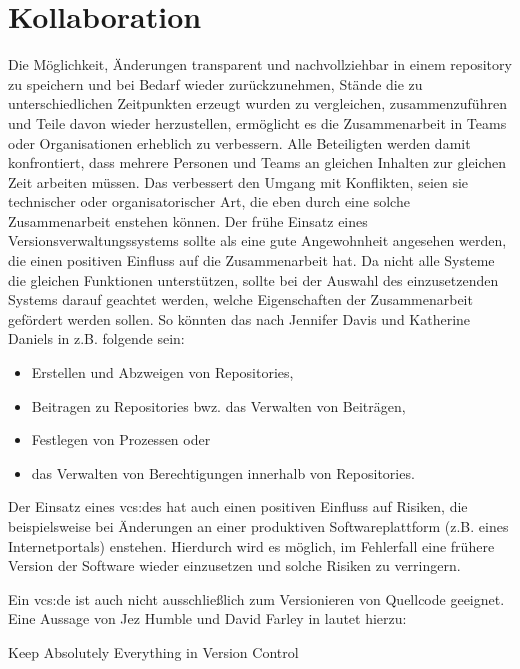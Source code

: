 \section{Kollaboration}\label{sec:collaboration}
Die Möglichkeit, Änderungen transparent und nachvollziehbar in einem
\gls{repository} zu speichern und bei Bedarf wieder zurückzunehmen, Stände die
zu unterschiedlichen Zeitpunkten erzeugt wurden zu vergleichen,
zusammenzuführen und Teile davon wieder herzustellen, ermöglicht es die
Zusammenarbeit in Teams oder Organisationen erheblich zu verbessern. Alle
Beteiligten werden damit konfrontiert, dass mehrere Personen und Teams an
gleichen Inhalten zur gleichen Zeit arbeiten müssen. Das verbessert den Umgang
mit Konflikten, seien sie technischer oder organisatorischer Art, die eben
durch eine solche Zusammenarbeit enstehen können. Der frühe Einsatz eines
Versionsverwaltungssystems sollte als eine gute Angewohnheit angesehen werden,
die einen positiven Einfluss auf die Zusammenarbeit hat. Da nicht alle Systeme
die gleichen Funktionen unterstützen, sollte bei der Auswahl des einzusetzenden
Systems darauf geachtet werden, welche Eigenschaften der Zusammenarbeit
gefördert werden sollen. So könnten das nach Jennifer Davis und Katherine
Daniels in \cite[S.~178]{effdo} z.B. folgende sein:

\begin{itemize}
\item Erstellen und Abzweigen von Repositories,
\item Beitragen zu Repositories bwz. das Verwalten von Beiträgen,
\item Festlegen von Prozessen oder
\item das Verwalten von Berechtigungen innerhalb von Repositories.
\end{itemize}

Der Einsatz eines \glspl{vcs:de} hat auch einen positiven Einfluss auf Risiken,
die beispielsweise bei Änderungen an einer produktiven Softwareplattform (z.B.
eines Internetportals) enstehen. Hierdurch wird es möglich, im Fehlerfall eine
frühere Version der Software wieder einzusetzen und solche Risiken zu
verringern.\cite[S.~178]{effdo}

Ein \acrlong{vcs:de} ist auch nicht ausschließlich zum Versionieren von Quellcode
geeignet. Eine Aussage von Jez Humble und David Farley in \cite[S.~33]{cd}
lautet hierzu:

\begin{center}
\glqq{}Keep Absolutely Everything in Version Control\grqq{}
\end{center}

